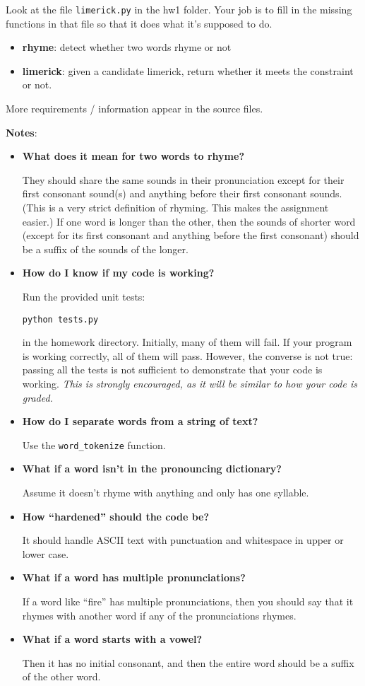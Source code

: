 \documentclass[11pt]{article}
\begin{document}
Look at the file \texttt{limerick.py} in the hw1 folder.  Your job is to fill
in the missing functions in that file so that it does what it’s
supposed to do.
\begin{itemize}
\item {\bf rhyme}: detect whether two words rhyme or not
\item {\bf limerick}: given a candidate limerick, return whether it meets the
constraint or not.
\end{itemize}
More requirements / information appear in the source files.

\clearpage

\noindent \textbf{Notes}:
\begin{itemize}
\item {\bf What does it mean for two words to rhyme?}

They should share the same sounds in their pronunciation except for their first consonant sound(s) and anything before their first consonant sounds.  (This is a very strict definition of rhyming.  This makes the assignment easier.)  If one word is longer than the other, then the sounds of shorter word (except for its first consonant and anything before the first consonant) should be a suffix of the sounds of the longer.

\item {\bf How do I know if my code is working?}

Run the provided unit tests:

\texttt{python tests.py}

in the homework directory.  Initially, many of them will fail.  If your program is working correctly, all of them will pass.  However, the converse is not true: passing all the tests is not sufficient to demonstrate that your code is working.  \emph{This is strongly encouraged, as it will be similar to how your code is graded.}

\item {\bf How do I separate words from a string of text?}

Use the \texttt{word\_tokenize} function.

\item {\bf What if a word isn’t in the pronouncing dictionary?}

Assume it doesn’t rhyme with anything and only has one syllable.

\item {\bf How ``hardened'' should the code be?}

It should handle ASCII text with punctuation and whitespace in upper or lower case.

\item {\bf What if a word has multiple pronunciations?}

If a word like “fire” has multiple pronunciations, then you should say
that it rhymes with another word if any of the pronunciations rhymes.

\item {\bf What if a word starts with a vowel?}

Then it has no initial consonant, and then the entire word should be a
suffix of the other word.
\end{itemize}
\end{document}
